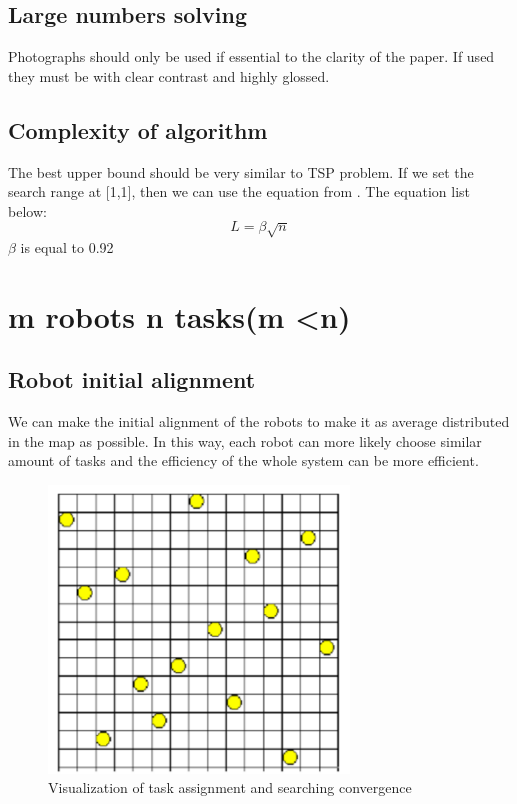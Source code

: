 \documentclass[a4paper]{article}
\begin{document}
\subsection{Large numbers solving}
Photographs should only be used if essential to the clarity of the paper. If used they must be with clear contrast and highly glossed.

\subsection{Complexity of algorithm}
The best upper bound should be very similar to TSP problem. If we set the search range at $[$1,1$]$, then we can use the equation from \cite{steinerberger2015new}. The equation list below:
	\[L =\beta\sqrt{n}\] 
$\beta$ is equal to 0.92



\section{m robots n tasks(m \textless n)}

\subsection{Robot initial alignment}
We can make the initial alignment of the robots to make it as average distributed in the map as possible. In this way, each robot can more likely choose similar amount of tasks and the efficiency of the whole system can be more efficient.
 \begin{figure}[h]
	\centering
	\includegraphics[width=8cm]{Pictures/spacefilling.png}
	\caption{Visualization of task assignment and searching convergence} 
	\label{figspacefilling}
\end{figure}
\end{document}
